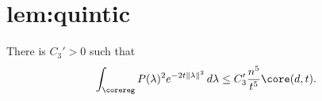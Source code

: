 \chapter{lem:quintic}\label{chap:lem_quintic}
\begin{lemma}\label{lem:quintic}
\leanok
There is $C_3'>0$ such that
\[
  \int_{\corereg}P(\lambda)^2 e^{-2t\|\lambda\|^2}\,d\lambda
  \le C_3'\frac{n^5}{t^5}\core(d,t).
\]
\end{lemma}
